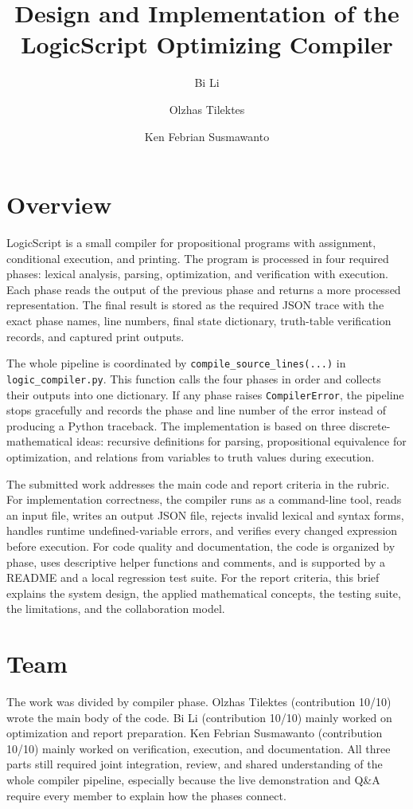 \documentclass[10pt]{article}
\title{Design and Implementation of the LogicScript Optimizing Compiler}
\author{Bi Li \and Olzhas Tilektes \and Ken Febrian Susmawanto}
\date{}
\begin{document}
\maketitle
\vspace{-1.2em}

\section{Overview}
LogicScript is a small compiler for propositional programs with assignment, conditional execution, and printing. The program is processed in four required phases: lexical analysis, parsing, optimization, and verification with execution. Each phase reads the output of the previous phase and returns a more processed representation. The final result is stored as the required JSON trace with the exact phase names, line numbers, final state dictionary, truth-table verification records, and captured print outputs.

The whole pipeline is coordinated by \texttt{compile\_source\_lines(...)} in \texttt{logic\_compiler.py}. This function calls the four phases in order and collects their outputs into one dictionary. If any phase raises \texttt{CompilerError}, the pipeline stops gracefully and records the phase and line number of the error instead of producing a Python traceback. The implementation is based on three discrete-mathematical ideas: recursive definitions for parsing, propositional equivalence for optimization, and relations from variables to truth values during execution.

The submitted work addresses the main code and report criteria in the rubric. For implementation correctness, the compiler runs as a command-line tool, reads an input file, writes an output JSON file, rejects invalid lexical and syntax forms, handles runtime undefined-variable errors, and verifies every changed expression before execution. For code quality and documentation, the code is organized by phase, uses descriptive helper functions and comments, and is supported by a README and a local regression test suite. For the report criteria, this brief explains the system design, the applied mathematical concepts, the testing suite, the limitations, and the collaboration model.

\section{Team}
The work was divided by compiler phase. Olzhas Tilektes (contribution 10/10) wrote the main body of the code. Bi Li (contribution 10/10) mainly worked on optimization and report preparation. Ken Febrian Susmawanto (contribution 10/10) mainly worked on verification, execution, and documentation. All three parts still required joint integration, review, and shared understanding of the whole compiler pipeline, especially because the live demonstration and Q\&A require every member to explain how the phases connect.
\end{document}
